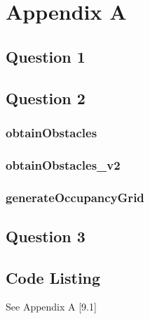\newpage
\renewcommand{\thesubsection}{\thesection.\arabic{subsection}}
\section{Appendix A}
	\subsection{Question 1}
	\pagebreak
	
	\subsection{Question 2}
	
		\subsubsection{obtainObstacles}
		
		\subsubsection{obtainObstacles_v2}
		
		\subsubsection{generateOccupancyGrid}
		
		\pagebreak
	
	\subsection{Question 3}
		
		
	\subsection*{Code Listing}
	See Appendix A [9.1]
	\\
	
	\pagebreak
	